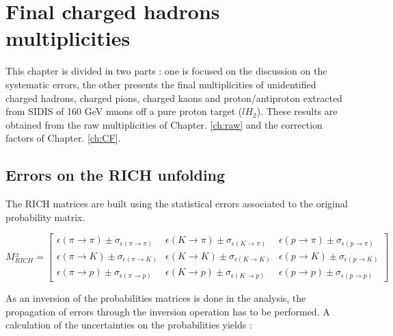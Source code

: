 
\chapter{Final charged hadrons multiplicities} %

\label{ch:mult} %


This chapter is divided in two parts : one is focused on the discussion on the systematic errors, the other presents the final multiplicities of unidentified charged hadrons, charged pions, charged kaons and proton/antiproton extracted from SIDIS of 160 GeV muons off a pure proton target ($lH_2$). These results are obtained from the raw multiplicities of Chapter. \ref{ch:raw} and the correction factors of Chapter. \ref{ch:CF}.

\section{Errors on the RICH unfolding}

The RICH matrices are built using the statistical errors associated to the original probability matrix.

\begin{equation}
M^{\pm}_{RICH}
=
\begin{bmatrix}
\epsilon(\pi \rightarrow \pi)\pm\sigma_{\epsilon(\pi \rightarrow \pi)} & \epsilon(K \rightarrow \pi)\pm\sigma_{\epsilon(K \rightarrow \pi)} & \epsilon(p \rightarrow \pi)\pm\sigma_{\epsilon(p \rightarrow \pi)}\\
\epsilon(\pi \rightarrow K)\pm\sigma_{\epsilon(\pi \rightarrow K)} & \epsilon(K \rightarrow K)\pm\sigma_{\epsilon(K \rightarrow K)} & \epsilon(p \rightarrow K)\pm\sigma_{\epsilon(p \rightarrow K)} \\
\epsilon(\pi \rightarrow p)\pm\sigma_{\epsilon(\pi \rightarrow p)} & \epsilon(K \rightarrow p)\pm\sigma_{\epsilon(K \rightarrow p)} & \epsilon(p \rightarrow p)\pm\sigma_{\epsilon(p \rightarrow p)}
\end{bmatrix}
\end{equation}

As an inversion of the probabilities matrices is done in the analysis, the propagation of errors through the
inversion operation has to be performed. A calculation of the uncertainties on the probabilities yields \cite{} :

